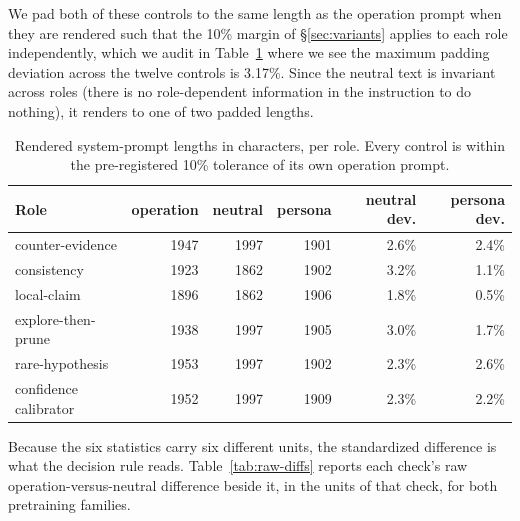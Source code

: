 We pad both of these controls to the same length as the operation prompt when they are rendered such
that the 10\% margin of \S\ref{sec:variants} applies to each role independently, which we audit in
Table~\ref{tab:padding} where we see the maximum padding deviation across the twelve controls is
3.17\%. Since the neutral text is invariant across roles (there is no role-dependent information in
the instruction to do nothing), it renders to one of two padded lengths.

\begin{table}[h]
\centering
\small
\begin{tabular}{lrrrrr}
\toprule
Role & operation & neutral & persona & neutral dev. & persona dev. \\
\midrule
counter-evidence      & 1947 & 1997 & 1901 & 2.6\% & 2.4\% \\
consistency           & 1923 & 1862 & 1902 & 3.2\% & 1.1\% \\
local-claim           & 1896 & 1862 & 1906 & 1.8\% & 0.5\% \\
explore-then-prune    & 1938 & 1997 & 1905 & 3.0\% & 1.7\% \\
rare-hypothesis       & 1953 & 1997 & 1902 & 2.3\% & 2.6\% \\
confidence calibrator & 1952 & 1997 & 1909 & 2.3\% & 2.2\% \\
\bottomrule
\end{tabular}
\caption{Rendered system-prompt lengths in characters, per role. Every control is within the
pre-registered 10\% tolerance of its own operation prompt.}
\label{tab:padding}
\end{table}

Because the six statistics carry six different units, the standardized difference is what the
decision rule reads. Table~\ref{tab:raw-diffs} reports each check's raw operation-versus-neutral
difference beside it, in the units of that check, for both pretraining families.

